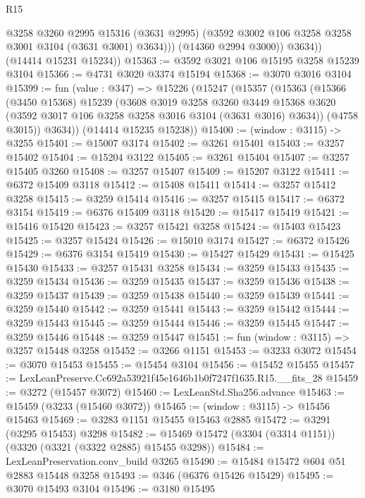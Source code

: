 \begin{lexlean}{R15}
\begin{coremodule}
                @3258
                @3260
                @2995
                @15316
                (@3631 @2995)
                (@3592 @3002 @106 @3258 @3258 @3001 @3104 (@3631 @3001) @3634)))
            (@14360 @2994 @3000))
          @3634))
      (@14414 @15231 @15234))
@15363 := @3592 @3021 @106 @15195 @3258 @15239 @3104
@15366 := @4731 @3020 @3374 @15194
@15368 := @3070 @3016 @3104
@15399 := fun (value : @347) =>
  @15226
    (@15247
      (@15357
        (@15363
          (@15366
            (@3450 @15368)
            @15239
            (@3608
              @3019
              @3258
              @3260
              @3449
              @15368
              @3620
              (@3592 @3017 @106 @3258 @3258 @3016 @3104 (@3631 @3016) @3634))
            (@4758 @3015))
          @3634))
      (@14414 @15235 @15238))
@15400 := (window : @3115) -> @3255
@15401 := @15007 @3174
@15402 := @3261 @15401
@15403 := @3257 @15402
@15404 := @15204 @3122
@15405 := @3261 @15404
@15407 := @3257 @15405 @3260
@15408 := @3257 @15407
@15409 := @15207 @3122
@15411 := @6372 @15409 @3118
@15412 := @15408 @15411
@15414 := @3257 @15412 @3258
@15415 := @3259 @15414
@15416 := @3257 @15415
@15417 := @6372 @3154
@15419 := @6376 @15409 @3118
@15420 := @15417 @15419
@15421 := @15416 @15420
@15423 := @3257 @15421 @3258
@15424 := @15403 @15423
@15425 := @3257 @15424
@15426 := @15010 @3174
@15427 := @6372 @15426
@15429 := @6376 @3154 @15419
@15430 := @15427 @15429
@15431 := @15425 @15430
@15433 := @3257 @15431 @3258
@15434 := @3259 @15433
@15435 := @3259 @15434
@15436 := @3259 @15435
@15437 := @3259 @15436
@15438 := @3259 @15437
@15439 := @3259 @15438
@15440 := @3259 @15439
@15441 := @3259 @15440
@15442 := @3259 @15441
@15443 := @3259 @15442
@15444 := @3259 @15443
@15445 := @3259 @15444
@15446 := @3259 @15445
@15447 := @3259 @15446
@15448 := @3259 @15447
@15451 := fun (window : @3115) => @3257 @15448 @3258
@15452 := @3266 @1151
@15453 := @3233 @3072
@15454 := @3070 @15453
@15455 := @15454 @3104
@15456 := @15452 @15455
@15457 := LexLeanPreserve.Cc692a53921f45e1646b1b0f7247f1635.R15.__fits_28
@15459 := @3272 (@15457 @3072)
@15460 := LexLeanStd.Sha256.advance
@15463 := @15459 (@3233 (@15460 @3072))
@15465 := (window : @3115) -> @15456 @15463
@15469 := @3283 @1151 @15455 @15463 @2885
@15472 := @3291 (@3295 @15453) @3298
@15482 := @15469 @15472 (@3304 (@3314 @1151)) (@3320 (@3321 (@3322 @2885) @15455 @3298))
@15484 := LexLeanPreservation.conv_build @3265
@15490 := @15484 @15472 @604 @51 @2883 @15448 @3258
@15493 := @346 (@6376 @15426 @15429)
@15495 := @3070 @15493 @3104
@15496 := @3180 @15495

\end{coremodule}
\end{lexlean}
